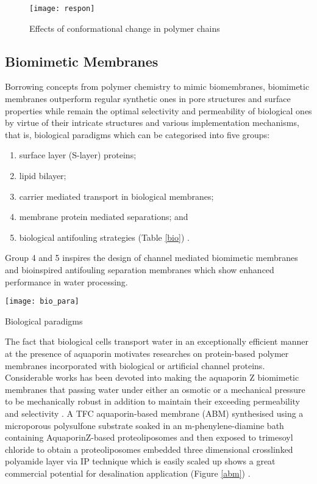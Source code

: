 \documentclass[a4paper,12pt]{report}
\begin{document}
\begin{figure}[h!]
\centering
  \texttt{[image: respon]}
  \caption{Effects of conformational change in polymer chains}
  \label{respon}
\end{figure}
 


\subsection{Biomimetic Membranes}
Borrowing concepts from polymer chemistry to mimic biomembranes, biomimetic membranes outperform regular synthetic ones in pore structures and surface properties while remain the optimal selectivity and permeability of biological ones by virtue of their intricate structures and various implementation mechanisms, that is, biological paradigms which can be categorised into five groups:
\begin{enumerate}
\item surface layer (S-layer) proteins; 
\item lipid bilayer;
\item carrier mediated transport in biological membranes; 
\item membrane protein mediated separations; and
\item biological antifouling strategies (Table \ref{bio}) \citep{14she}. 
\end{enumerate}
Group 4 and 5 inspires the design of channel mediated biomimetic membranes and bioinspired antifouling separation membranes which show enhanced performance in water processing.

\begin{table}[h!]  
\texttt{[image: bio\_para]}
  \caption{Biological paradigms}
  \label{bio}
\end{table}

The fact that biological cells transport water in an exceptionally efficient manner at the presence of aquaporin \citep{13mar} motivates researches on protein-based polymer membranes incorporated with biological\citep{42kum} or artificial channel proteins\citep{43fyl}. Considerable works has been devoted into making the aquaporin Z biomimetic membranes that passing water under either an osmotic or a mechanical pressure to be mechanically robust in addition to maintain their exceeding permeability and selectivity \citep{45akauf, 45bli, 45chong, 45dli, 45eli}. A TFC aquaporin-based membrane (ABM) synthesised using a microporous polysulfone substrate soaked in an m-phenylene-diamine bath containing AquaporinZ-based proteoliposomes and then exposed to trimesoyl chloride to obtain a proteoliposomes embedded three dimensional crosslinked polyamide layer via IP technique which is easily scaled up shows a great commercial potential for desalination application (Figure \ref{abm}) \citep{46zhao}.
\end{document}
